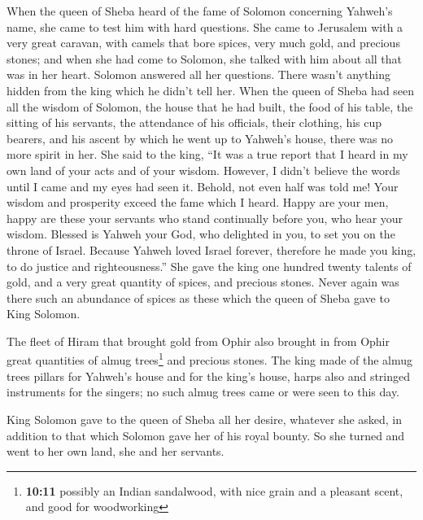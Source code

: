  When the queen of Sheba heard of the fame of Solomon
concerning Yahweh's name, she came to test him with hard questions.
 She came to Jerusalem with a very great caravan, with
camels that bore spices, very much gold, and precious stones; and when
she had come to Solomon, she talked with him about all that was in her
heart.  Solomon answered all her questions. There wasn't
anything hidden from the king which he didn't tell her. 
When the queen of Sheba had seen all the wisdom of Solomon, the house
that he had built,  the food of his table, the sitting of
his servants, the attendance of his officials, their clothing, his cup
bearers, and his ascent by which he went up to Yahweh's house, there was
no more spirit in her.  She said to the king, ``It was a
true report that I heard in my own land of your acts and of your wisdom.
 However, I didn't believe the words until I came and my
eyes had seen it. Behold, not even half was told me! Your wisdom and
prosperity exceed the fame which I heard.  Happy are your
men, happy are these your servants who stand continually before you, who
hear your wisdom.  Blessed is Yahweh your God, who
delighted in you, to set you on the throne of Israel. Because Yahweh
loved Israel forever, therefore he made you king, to do justice and
righteousness.''  She gave the king one hundred twenty
talents of gold, and a very great quantity of spices, and precious
stones. Never again was there such an abundance of spices as these which
the queen of Sheba gave to King Solomon.

 The fleet of Hiram that brought gold from Ophir also
brought in from Ophir great quantities of almug trees\footnote{\textbf{10:11}
  possibly an Indian sandalwood, with nice grain and a pleasant scent,
  and good for woodworking} and precious stones.  The
king made of the almug trees pillars for Yahweh's house and for the
king's house, harps also and stringed instruments for the singers; no
such almug trees came or were seen to this day.

 King Solomon gave to the queen of Sheba all her desire,
whatever she asked, in addition to that which Solomon gave her of his
royal bounty. So she turned and went to her own land, she and her
servants.

